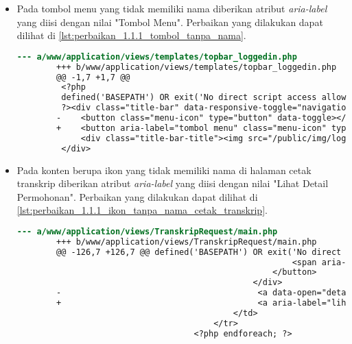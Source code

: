 \begin{itemize}
    \item Pada tombol menu yang tidak memiliki nama diberikan atribut \textit{aria-label} yang diisi dengan nilai "Tombol Menu". Perbaikan yang dilakukan dapat dilihat di \ref{lst:perbaikan_1.1.1_tombol_tanpa_nama}.
    \begin{lstlisting}[frame=single, label={lst:perbaikan_1.1.1_tombol_tanpa_nama}, language=diff, caption=Perbaikan Kriteria Sukses 1.1.1 - Tombol Tanpa Nama]
        --- a/www/application/views/templates/topbar_loggedin.php
        +++ b/www/application/views/templates/topbar_loggedin.php
        @@ -1,7 +1,7 @@
         <?php
         defined('BASEPATH') OR exit('No direct script access allowed');
         ?><div class="title-bar" data-responsive-toggle="navigation-menu" data-hide-for="medium">
        -    <button class="menu-icon" type="button" data-toggle></button>
        +    <button aria-label="tombol menu" class="menu-icon" type="button" data-toggle></button>
             <div class="title-bar-title"><img src="/public/img/logo.png" class="textsized" alt="B"/></div>
         </div>
    \end{lstlisting}

    \item Pada konten berupa ikon yang tidak memiliki nama di halaman cetak transkrip diberikan atribut \textit{aria-label} yang diisi dengan nilai "Lihat Detail Permohonan". Perbaikan yang dilakukan dapat dilihat di \ref{lst:perbaikan_1.1.1_ikon_tanpa_nama_cetak_transkrip}.
    \begin{lstlisting}[frame=single, label={lst:perbaikan_1.1.1_ikon_tanpa_nama_cetak_transkrip}, language=diff, caption=Perbaikan Kriteria Sukses 1.1.1 - Ikon Tanpa Nama di Halaman Cetak Transkrip]
        --- a/www/application/views/TranskripRequest/main.php
        +++ b/www/application/views/TranskripRequest/main.php
        @@ -126,7 +126,7 @@ defined('BASEPATH') OR exit('No direct script access allowed');
                                                        <span aria-hidden="true">&times;</span>
                                                    </button>
                                                </div>
        -                                        <a data-open="detail<?= $request->id ?>"><i class="fi-eye"></i></a>
        +                                        <a aria-label="lihat detail permohonan" data-open="detail<?= $request->id ?>"><i class="fi-eye"></i></a>
                                            </td>
                                        </tr>
                                    <?php endforeach; ?>
    \end{lstlisting}


\end{itemize}
